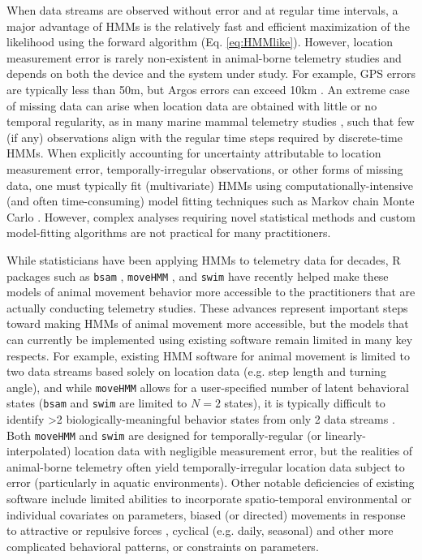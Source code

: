 \documentclass[12pt]{article}
\begin{document}
When data streams are observed without error and at regular time intervals, a major advantage of HMMs is the relatively fast and efficient maximization of the likelihood using the forward algorithm (Eq. \ref{eq:HMMlike}).  However, location measurement error is rarely non-existent in animal-borne telemetry studies and depends on both the device and the system under study.  For example, GPS errors are typically less than 50m, but Argos errors can exceed 10km \citep[e.g.][]{CostaEtAl2010}.  An extreme case of missing data can arise when location data are obtained with little or no temporal regularity, as in many marine mammal telemetry studies \citep[e.g.][]{JonsenEtAl2005}, such that few (if any) observations align with the regular time steps required by discrete-time HMMs. When explicitly accounting for uncertainty attributable to location measurement error, temporally-irregular observations, or other forms of missing data, one must typically fit (multivariate) HMMs using computationally-intensive (and often time-consuming) model fitting techniques such as Markov chain Monte Carlo \citep{JonsenEtAl2005,McClintockEtAl2012}.  However, complex analyses requiring novel statistical methods and custom model-fitting algorithms are not practical for many practitioners.

While statisticians have been applying HMMs to telemetry data for decades, R \citep{RCoreTeam2016} packages such as \verb|bsam| \citep{JonsenEtAl2005}, \verb|moveHMM| \citep{MichelotEtAl2016}, and \verb|swim| \citep{WhoriskeyEtAl2017} have recently helped make these models of animal movement behavior more accessible to the practitioners that are actually conducting telemetry studies.  These advances represent important steps toward making HMMs of animal movement more accessible, but the models that can currently be implemented using existing software remain limited in many key respects. For example, existing HMM software for animal movement is limited to two data streams based solely on location data (e.g. step length and turning angle), and while \verb|moveHMM| allows for a user-specified number of latent behavioral states (\verb|bsam| and \verb|swim| are limited to $N=2$ states), it is typically difficult to identify >2 biologically-meaningful behavior states from only 2 data streams \citep[e.g.][]{MoralesEtAl2004,BeyerEtAl2013,McClintockEtAl2014b}. Both \verb|moveHMM| and \verb|swim| are designed for temporally-regular (or linearly-interpolated) location data with negligible measurement error, but the realities of animal-borne telemetry often yield temporally-irregular location data subject to error (particularly in aquatic environments). Other notable deficiencies of existing software include limited abilities to incorporate spatio-temporal environmental or individual covariates on parameters, biased (or directed) movements in response to attractive or repulsive forces \citep[e.g.][]{McClintockEtAl2012,LangrockEtAl2014}, cyclical (e.g. daily, seasonal) and other more complicated behavioral patterns, or constraints on parameters. 
\end{document}

